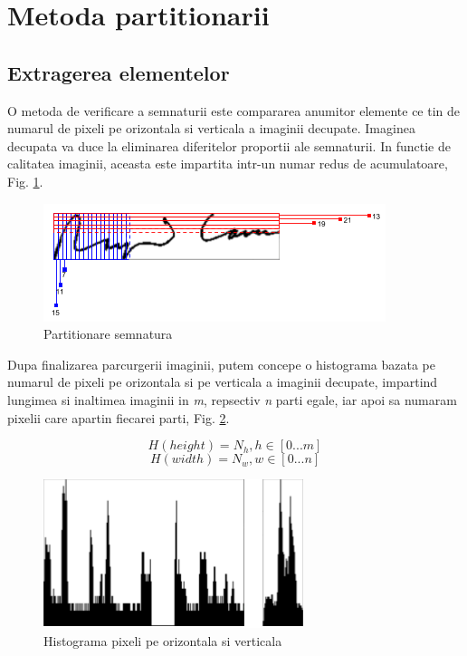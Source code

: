 \documentclass[conference]{IEEEtran}
\begin{document}
\section{Metoda partitionarii}
\subsection{Extragerea elementelor}
O metoda de verificare a semnaturii este compararea anumitor elemente ce tin de numarul de pixeli pe orizontala si verticala a imaginii decupate. Imaginea decupata va duce la eliminarea diferitelor proportii ale semnaturii. In functie de calitatea imaginii, aceasta este impartita intr-un numar redus de acumulatoare, Fig. \ref{fig:SignatureProcess}.

\begin{figure}[h!]
	\includegraphics[width=\linewidth]{Figures/SignatureProcess.png}
	\caption{Partitionare semnatura}
	\label{fig:SignatureProcess}
\end{figure}

Dupa finalizarea parcurgerii imaginii, putem concepe o histograma bazata pe numarul de pixeli pe orizontala si pe verticala a imaginii decupate, impartind lungimea si inaltimea imaginii in \textit{m}, repsectiv \textit{n} parti egale, iar apoi sa numaram pixelii care apartin fiecarei parti, Fig. \ref{fig:Histograma}.

\begin{equation}
H(height)=N_{h}, h \in [0...m]\label{eq}
\end{equation}
\begin{equation}
H(width)=N_{w}, w \in [0...n]\label{eq}
\end{equation}

\begin{figure}[h!]
	\centering
	\includegraphics[scale=0.55]{Figures/Histograma.png}
	\caption{Histograma pixeli pe orizontala si verticala}
	\label{fig:Histograma}
\end{figure}
\end{document}
